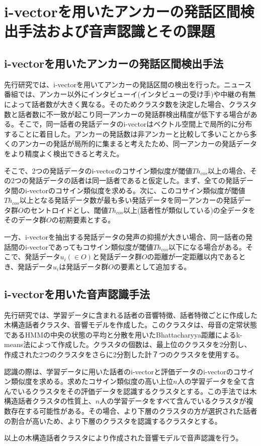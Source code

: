 \chapter{i-vectorを用いたアンカーの発話区間検出手法および音声認識とその課題}

\section{i-vectorを用いたアンカーの発話区間検出手法}
\label{section:clustering}
先行研究\cite{nozaki_gakuseikai}では、i-vectorを用いてアンカーの発話区間の検出を行った。ニュース番組では、アンカー以外にインタビューイ(インタビューの受け手)や中継の有無によって話者数が大きく異なる。そのためクラスタ数を決定した場合、クラスタ数と話者数に不一致が起こり同一アンカーの発話群検出精度が低下する場合がある。そこで，同一話者の発話データのi-vectorはベクトル空間上で局所的に分布することに着目した。アンカーの発話数は非アンカーと比較して多いことから多くのアンカーの発話が局所的に集まると考えたため、同一アンカーの発話データをより精度よく検出できると考えた。\par
そこで、2つの発話データのi-vectorのコサイン類似度が閾値$Th_{cos}$以上の場合、その2つの発話データの話者は同一話者であると仮定した。まず、全ての発話データ間のi-vectorのコサイン類似度を求める。次に、このコサイン類似度が閾値$Th_{cos}$以上となる発話データ数が最も多い発話データを同一アンカーの発話データ群$O$のセントロイドとし、閾値$Th_{cos}$以上(話者性が類似している)の全データをそのデータ群$O$の初期要素とする。\par
一方、i-vectorを抽出する発話データの発声の抑揚が大きい場合、同一話者の発話間のi-vectorであってもコサイン類似度が閾値$Th_{cos}$以下になる場合がある。そこで、発話データ$u_i(\in O)$と発話データ群$O$の距離が一定距離以内であるとき、発話データ$u_i$は発話データ群$O$の要素として追加する。\par

\section{i-vectorを用いた音声認識手法}
\label{section:yoshimura_pre_clustering}
先行研究\cite{yoshimura_clustering}では、学習データに含まれる話者の音響特徴、話者特徴ごとに作成した木構造話者クラスタ、音響モデルを作成した。このクラスタは、母音の定常状態であるHMMの中央の状態の平均と分散を用いたBhattacharyya距離によるk-means法によって作成した。クラスタの個数は、最上位のクラスタを2分割し、作成された2つのクラスタをさらに2分割した計７つのクラスタを使用する。\par
認識の際は、学習データに用いた話者のi-vectorと評価データのi-vectorのコサイン類似度を求める。求めたコサイン類似度の高い上位$n$人の学習データを全て含んでいるクラスタをその評価データを認識するクラスタとする。この手法では木構造話者クラスタの性質上、$n$人の学習データをすべて含んでいるクラスタが複数存在する可能性がある。その場合、より下層のクラスタの方が選択された話者の割合が高いため、より下層のクラスタを認識するクラスタとする。\par
以上の木構造話者クラスタにより作成された音響モデルで音声認識を行う。

